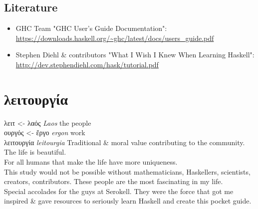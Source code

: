 \documentclass[a4paper,14pt,oneside]{book}
\begin{document}
\chapter{Literature}
\label{sec:org153b815}

\begin{itemize}
\item GHC Team "GHC User’s Guide Documentation": \url{https://downloads.haskell.org/\~ghc/latest/docs/users\_guide.pdf}\\
\item Stephen Diehl \& contributors "What I Wish I Knew When Learning Haskell": \url{http://dev.stephendiehl.com/hask/tutorial.pdf}\\
\end{itemize}

\part{λειτουργία}
\label{sec:org4e20980}

λειτ       <- λαός  \emph{Laos}       the people\\
    ουργός <- ἔργο  \emph{ergon}      work\\
λειτουργία          \emph{leitourgia} Traditional \& moral value contributing to the community.\\

The life is beautiful.\\
For all humans that make the life have more uniqueness.\\

This study would not be possible without mathematicians, Haskellers, scientists, creators, contributors. These people are the most fascinating in my life.\\

Special accolades for the guys at Serokell. They were the force that got me inspired \& gave resources to seriously learn Haskell and create this pocket guide.\\
\end{document}
